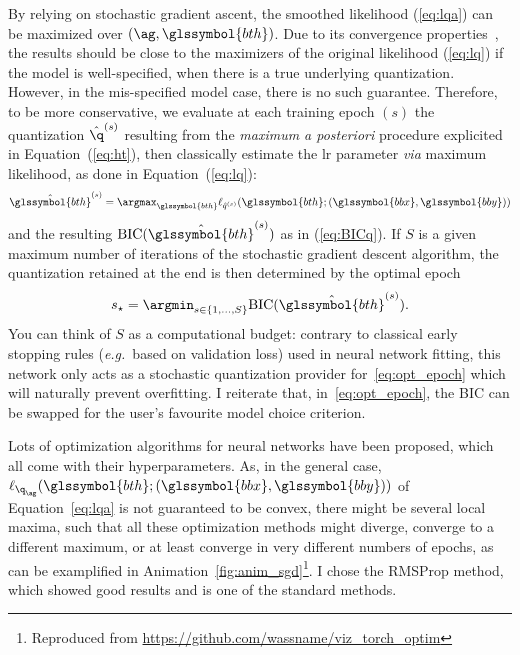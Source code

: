 By relying on stochastic gradient ascent, the smoothed likelihood (\ref{eq:lqa}) can be maximized over $\left(\ag, \glssymbol{bth} \right)$. Due to its convergence properties~\cite{bottou2010large}, the results should be close to the maximizers of the original likelihood (\ref{eq:lq}) if the model is well-specified, when there is a true underlying quantization. However, in the mis-specified model case, there is no such guarantee. Therefore, to be more conservative, we evaluate at each training epoch $(s)$ the quantization $\hat{\q}^{(s)}$ resulting from the \textit{maximum a posteriori} procedure explicited in Equation~(\ref{eq:ht}), then classically estimate the \gls{lr} parameter \textit{via} maximum likelihood, as done in Equation~(\ref{eq:lq}):
\begin{equation} \label{eq:lr_param_q}
\hat{\glssymbol{bth}}^{(s)} = \argmax_{\glssymbol{bth}} \ell_{\hat{q}^{(s)}}(\glssymbol{bth}; (\glssymbol{bbx},\glssymbol{bby}))
\end{equation}
and the resulting $\mbox{BIC}(\hat{\glssymbol{bth}}^{(s)})$ as in (\ref{eq:BICq}). If $S$ is a given maximum number of iterations of the stochastic gradient descent algorithm, the quantization retained at the end is then determined by the optimal epoch
\begin{equation} \label{eq:opt_epoch}
s_\star=\argmin_{s\in \{1,\ldots, S\}} \mbox{BIC}(\hat{\glssymbol{bth}}^{(s)}).
\end{equation}
You can think of $S$ as a computational budget: contrary to classical early stopping rules (\textit{e.g.}\ based on validation loss) used in neural network fitting, this network only acts as a stochastic quantization provider for~\eqref{eq:opt_epoch} which will naturally prevent overfitting. I reiterate that, in~\eqref{eq:opt_epoch}, the BIC can be swapped for the user's favourite model choice criterion.

Lots of optimization algorithms for neural networks have been proposed, which all come with their hyperparameters. As, in the general case, $\ell_{\q_{\ag}}(\glssymbol{bth} ; (\glssymbol{bbx},\glssymbol{bby}))$ of Equation~\eqref{eq:lqa} is not guaranteed to be convex, there might be several local maxima, such that all these optimization methods might diverge, converge to a different maximum, or at least converge in very different numbers of epochs, as can be examplified in Animation~\ref{fig:anim_sgd}\footnote{Reproduced from \url{https://github.com/wassname/viz_torch_optim}}. I chose the RMSProp method, which showed good results and is one of the standard methods.

